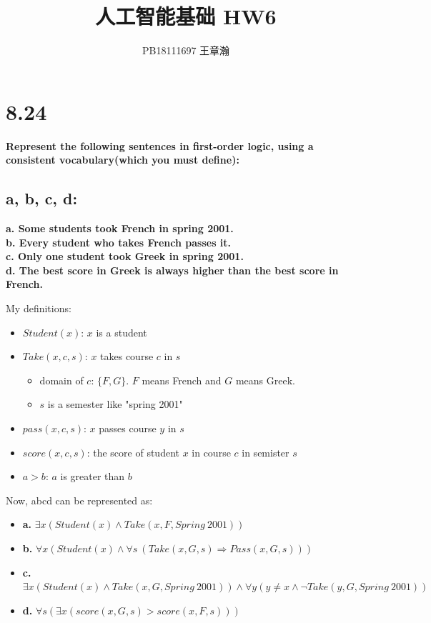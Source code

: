 \documentclass[UTF8]{article}
\title{人工智能基础 HW6}
\author{PB18111697 王章瀚}
\newcommand{\jumpLine} {\hspace*{\fill} \par}
\begin{document}
\maketitle
\section*{8.24}
\noindent \textbf{Represent the following sentences in first-order logic, using a consistent vocabulary(which you must define): }
\subsection*{a, b, c, d:}
\noindent \textbf{a. Some students took French in spring 2001.}\\
\noindent \textbf{b. Every student who takes French passes it.}\\
\noindent \textbf{c. Only one student took Greek in spring 2001.}\\
\noindent \textbf{d. The best score in Greek is always higher than the best score in French.}\\\jumpLine\noindent
My definitions:
\begin{itemize}
	\item $Student(x)$: $x$ is a student
	\item $Take(x, c, s)$: $x$ takes course $c$ in $s$
	\begin{itemize}
		\item domain of $c$: $\{F, G\}$. $F$ means French and $G$ means Greek.
		\item $s$ is a semester like "spring 2001"
	\end{itemize}
	\item $pass(x, c, s)$: $x$ passes course $y$ in $s$
	\item $score(x, c, s)$: the score of student $x$ in course $c$ in semister $s$
	\item $a>b$: $a$ is greater than $b$
\end{itemize}
Now, abcd can be represented as:
\begin{itemize}
	\item \textbf{a.} $\exists x (Student(x) \land Take(x, F, Spring\ 2001))$
	\item \textbf{b.} $\forall x (Student(x) \land \forall s\ (Take(x, G, s)\Rightarrow Pass(x, G, s)))$
	\item \textbf{c.} $\exists x (Student(x)\land Take(x, G, Spring\ 2001))\land \forall y (y\not= x\land \lnot Take(y,G,Spring\ 2001))$
	\item \textbf{d.} $\forall s(\exists x(score(x,G,s)>score(x,F,s)))$
\end{itemize}
\end{document}
